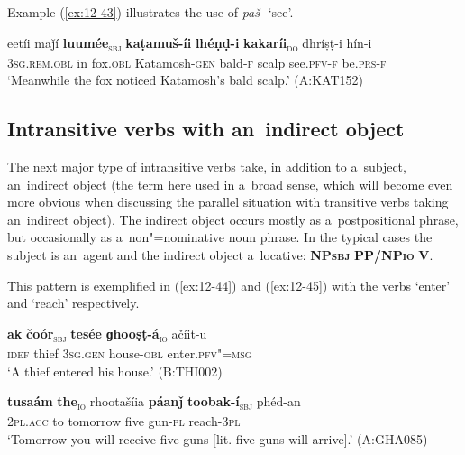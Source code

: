 Example (\ref{ex:12-43}) illustrates the use of \textit{paš-} `see'.

\begin{exe}
\ex
\label{ex:12-43}
\gll eetíi maǰí {\ob}\textbf{luumée}{\cb}\textsubscript{\textsc{\upshape sbj}} {\ob}\textbf{kaṭamuš-íi} \textbf{lhéṇḍ-i} \textbf{kakaríi}{\cb}\textsubscript{\textsc{\upshape do}} dhríṣṭ-i hín-i\\
\textsc{3sg.rem.obl} in fox.\textsc{obl} Katamosh-\textsc{gen} bald-\textsc{f} scalp see.\textsc{pfv-f} be.\textsc{prs-f}\\
\glt `Meanwhile the fox noticed Katamosh's bald scalp.' (A:KAT152)
\end{exe}

\subsection{Intransitive verbs with an~indirect object}
\label{subsec:12-2-4}

The next major type of intransitive verbs take, in addition to a~subject, an~indirect object (the term here used in a~broad sense, which will become even more obvious when discussing the parallel situation with transitive verbs taking an~indirect object). The indirect object occurs mostly as a~postpositional phrase, but occasionally as a~non"=nominative noun phrase. In the typical cases the subject is an~agent and the indirect object a~locative: \textbf{NP\textsc{sbj}} \textbf{PP/NP\textsc{io}} \textbf{V}.


This pattern is exemplified in (\ref{ex:12-44}) and (\ref{ex:12-45}) with the verbs `enter' and `reach' respectively.

\begin{exe}
\ex
\label{ex:12-44}
\gll {\ob}\textbf{ak} \textbf{čoór}{\cb}\textsubscript{\textsc{\upshape sbj}} {\ob}\textbf{tesée} \textbf{ɡhooṣṭ-á}{\cb}\textsubscript{\textsc{\upshape io}} ačíit-u\\
\textsc{idef} thief \textsc{3sg.gen} house-\textsc{obl} enter.\textsc{pfv"=msg}\\
\glt `A thief entered his house.' (B:THI002)
\end{exe}
\begin{exe}
\ex
\label{ex:12-45}
\gll {\ob}\textbf{tusaám} \textbf{the}{\cb}\textsubscript{\textsc{\upshape io}} rhootašíia {\ob}\textbf{páanǰ} \textbf{toobak-í}{\cb}\textsubscript{\textsc{\upshape sbj}} phéd-an\\
2\textsc{pl.acc} to tomorrow five gun-\textsc{pl} reach-\textsc{3pl}\\
\glt `Tomorrow you will receive five guns [lit. five guns will arrive].' (A:GHA085)
\end{exe}

